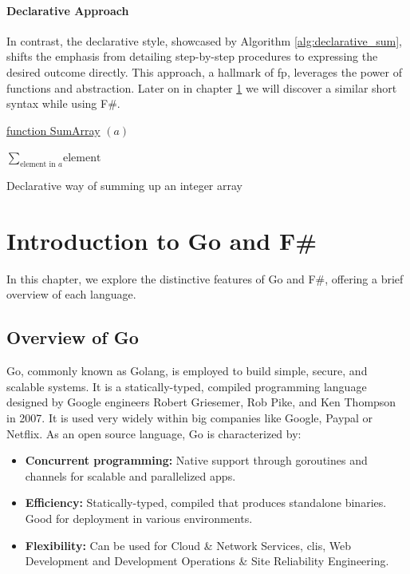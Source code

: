 \subsubsection{Declarative Approach}

In contrast, the declarative style, showcased by Algorithm \ref{alg:declarative_sum}, shifts the emphasis from detailing step-by-step procedures to expressing the desired outcome directly. This approach, a hallmark of \ac{fp}, leverages the power of functions and abstraction. Later on in chapter \ref{chap:language-comparison} we will discover a similar short syntax while using F\#.

\begin{algorithm}

    \underline{function SumArray} $(a)$\;
    
    \BlankLine
    \Return $\sum_{\text{element in } a} \text{element}$
    
    \caption{Declarative way of summing up an integer array}
    \label{alg:declarative_sum}
\end{algorithm}

\chapter{Introduction to Go and F\#}\label{chap:language-comparison}
In this chapter, we explore the distinctive features of Go and F\#, offering a brief overview of each language.

    \section{Overview of Go}\label{sec:go-overview}
    Go, commonly known as Golang, is employed to build simple, secure, and scalable systems. It is a statically-typed, compiled programming language designed by Google engineers Robert Griesemer, Rob Pike, and Ken Thompson in 2007. It is used very widely within big companies like Google, Paypal or Netflix. As an open source language, Go is characterized by: 
    \begin{itemize}
        \item \textbf{Concurrent programming:}  Native support through goroutines and channels for scalable and parallelized \ac{app}s.
        \item \textbf{Efficiency:} Statically-typed, compiled that produces standalone binaries. Good for deployment in various environments.
        \item \textbf{Flexibility:} Can be used for Cloud \& Network Services, \ac{cli}s, Web Development and Development Operations \& Site Reliability Engineering.
    \end{itemize}
    \cite{Gowebsite}

